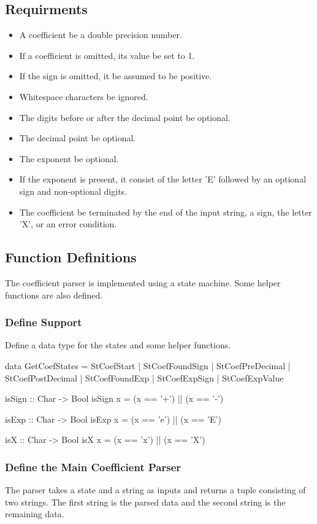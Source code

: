 \subsection{Requirments}
\begin{itemize}
\item A coefficient  be a double precision number.
\item If a coefficient is omitted, its value  be set to 1.
\item If the sign is omitted, it  be assumed to be positive.
\item Whitespace characters  be ignored.
\item The digits before or after the decimal point  be optional.
\item The decimal point  be optional.
\item The exponent  be optional.
\item If the exponent is present, it  consist of the letter 'E' followed by an optional sign and non-optional digits.
\item The coefficient  be terminated by the end of the input string, a sign, the letter 'X', or an error condition.
\end{itemize}

\subsection{Function Definitions}

The coefficient parser is implemented using a state machine.  Some helper functions are also defined.
\subsubsection{Define Support}
Define a data type for the states and some helper functions.
\begin{code}
data GetCoefStates = StCoefStart | StCoefFoundSign | StCoefPreDecimal | StCoefPostDecimal | StCoefFoundExp | StCoefExpSign | StCoefExpValue

isSign :: Char -> Bool
isSign x = (x == '+') || (x == '-')

isExp :: Char -> Bool
isExp x = (x == 'e') || (x == 'E')

isX :: Char -> Bool
isX x = (x == 'x') || (x == 'X')
\end{code}
\subsubsection{Define the Main Coefficient Parser}
The parser takes a state and a string as inputs and returns a tuple consisting of two strings.  The first string is the parsed data and the second string is the remaining data.

